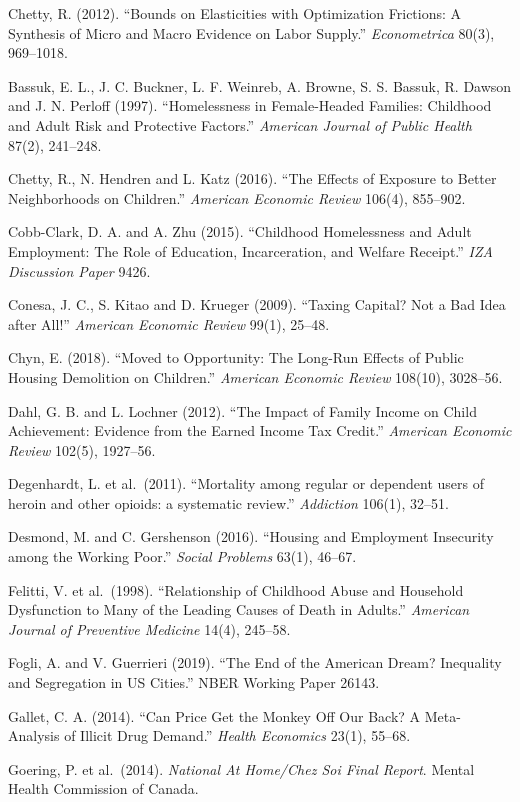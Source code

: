 \documentclass[10pt]{article}
\begin{document}
{\begin{list}{}{\setlength{\leftmargin}{1.5em}\setlength{\itemindent}{-1.5em}\setlength{\itemsep}{0.35em}\setlength{\parsep}{0em}}
\item Chetty, R. (2012). ``Bounds on Elasticities with Optimization Frictions: A Synthesis of Micro and Macro Evidence on Labor Supply.'' \emph{Econometrica} 80(3), 969--1018.
\item Bassuk, E. L., J. C. Buckner, L. F. Weinreb, A. Browne, S. S. Bassuk, R. Dawson and J. N. Perloff (1997). ``Homelessness in Female-Headed Families: Childhood and Adult Risk and Protective Factors.'' \emph{American Journal of Public Health} 87(2), 241--248.
\item Chetty, R., N. Hendren and L. Katz (2016). ``The Effects of Exposure to Better Neighborhoods on Children.'' \emph{American Economic Review} 106(4), 855--902.
\item Cobb-Clark, D. A. and A. Zhu (2015). ``Childhood Homelessness and Adult Employment: The Role of Education, Incarceration, and Welfare Receipt.'' \emph{IZA Discussion Paper} 9426.
\item Conesa, J. C., S. Kitao and D. Krueger (2009). ``Taxing Capital? Not a Bad Idea after All!'' \emph{American Economic Review} 99(1), 25--48.
\item Chyn, E. (2018). ``Moved to Opportunity: The Long-Run Effects of Public Housing Demolition on Children.'' \emph{American Economic Review} 108(10), 3028--56.
\item Dahl, G. B. and L. Lochner (2012). ``The Impact of Family Income on Child Achievement: Evidence from the Earned Income Tax Credit.'' \emph{American Economic Review} 102(5), 1927--56.
\item Degenhardt, L. et al.\ (2011). ``Mortality among regular or dependent users of heroin and other opioids: a systematic review.'' \emph{Addiction} 106(1), 32--51.
\item Desmond, M. and C. Gershenson (2016). ``Housing and Employment Insecurity among the Working Poor.'' \emph{Social Problems} 63(1), 46--67.
\item Felitti, V. et al.\ (1998). ``Relationship of Childhood Abuse and Household Dysfunction to Many of the Leading Causes of Death in Adults.'' \emph{American Journal of Preventive Medicine} 14(4), 245--58.
\item Fogli, A. and V. Guerrieri (2019). ``The End of the American Dream? Inequality and Segregation in US Cities.'' NBER Working Paper 26143.
\item Gallet, C. A. (2014). ``Can Price Get the Monkey Off Our Back? A Meta-Analysis of Illicit Drug Demand.'' \emph{Health Economics} 23(1), 55--68.
\item Goering, P. et al.\ (2014). \emph{National At Home/Chez Soi Final Report}. Mental Health Commission of Canada.

\end{list}}
\end{document}
